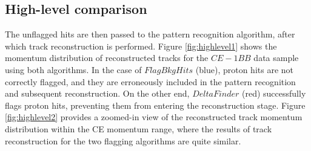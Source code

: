 \subsection{High-level comparison}
The unflagged hits are then passed to the pattern 
recognition algorithm, after which 
track reconstruction is performed. 
Figure \ref{fig:highlevel1} shows the momentum 
distribution of reconstructed tracks for the $CE-1BB$ 
data sample using both algorithms. 
In the case of $FlagBkgHits$ (blue), proton hits are not 
correctly flagged, and they are erroneously included in the  
pattern recognition and subsequent reconstruction. 
On the other end, $DeltaFinder$ (red) successfully flags 
proton hits, preventing them from entering the reconstruction stage. 
Figure \ref{fig:highlevel2} provides a zoomed-in view 
of the reconstructed track momentum distribution within 
the CE momentum range, where the results of track reconstruction 
for the two flagging algorithms are quite similar.


